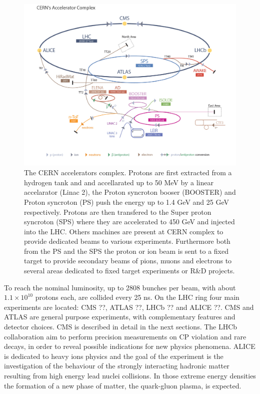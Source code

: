 \begin{figure}[!h]
  \includegraphics[width = 1.\textwidth]{figures/cms/LHC_accelarator_complex.jpg}
  \caption{The CERN accelerators complex. Protons are first extracted from a hydrogen tank and and accellarated up to 50 MeV by
    a linear accelarator (Linac 2), the Proton syncroton booser (BOOSTER) and Proton syncroton (PS) push the energy up to
    1.4 GeV and 25 GeV respectively. Protons are then transfered to the Super proton syncroton (SPS) where they are accelerated to
    450 GeV and injected into the LHC. Others machines are present at CERN complex to provide dedicated beams to various experiments.
    Furthermore both from the PS and the SPS the proton or ion beam is sent to a fixed target to provide secondary beams of pions, muons and electrons to several areas dedicated to fixed target experiments or R\&D projects. 
  }
  \label{fig:lhc_chain}  
\end{figure}

To reach the nominal luminosity, up to 2808 bunches per beam, with about $1.1\times 10^{10}$
protons each, are collided every 25 ns.
On the LHC ring four main experiments are located: CMS ??, ATLAS ??, LHCb ?? and
ALICE ??. CMS and ATLAS are general purpose experiments, with complementary features
and detector choices. CMS is described in detail in the next sections. The LHCb collaboration
aim to perform precision measurements on CP violation and rare decays, in order to reveal
possible indications for new physics phenomena. ALICE is dedicated to heavy ions physics and the
goal of the experiment is the investigation of the behaviour of the strongly interacting hadronic
matter resulting from high energy lead nuclei collisions. In those extreme energy densities the
formation of a new phase of matter, the quark-gluon plasma, is expected.
 
